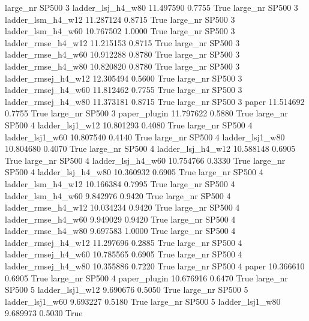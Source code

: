   large_nr    SP500                 3   ladder_lsj_h4_w80  11.497590      0.7755    True
  large_nr    SP500                 3   ladder_lsm_h4_w12  11.287124      0.8715    True
  large_nr    SP500                 3   ladder_lsm_h4_w60  10.767502      1.0000    True
  large_nr    SP500                 3  ladder_rmse_h4_w12  11.215153      0.8715    True
  large_nr    SP500                 3  ladder_rmse_h4_w60  10.912288      0.8780    True
  large_nr    SP500                 3  ladder_rmse_h4_w80  10.820820      0.8780    True
  large_nr    SP500                 3 ladder_rmsej_h4_w12  12.305494      0.5600    True
  large_nr    SP500                 3 ladder_rmsej_h4_w60  11.812462      0.7755    True
  large_nr    SP500                 3 ladder_rmsej_h4_w80  11.373181      0.8715    True
  large_nr    SP500                 3               paper  11.514692      0.7755    True
  large_nr    SP500                 3        paper_plugin  11.797622      0.5880    True
  large_nr    SP500                 4     ladder_lsj1_w12  10.801293      0.4080    True
  large_nr    SP500                 4     ladder_lsj1_w60  10.807540      0.4140    True
  large_nr    SP500                 4     ladder_lsj1_w80  10.804680      0.4070    True
  large_nr    SP500                 4   ladder_lsj_h4_w12  10.588148      0.6905    True
  large_nr    SP500                 4   ladder_lsj_h4_w60  10.754766      0.3330    True
  large_nr    SP500                 4   ladder_lsj_h4_w80  10.360932      0.6905    True
  large_nr    SP500                 4   ladder_lsm_h4_w12  10.166384      0.7995    True
  large_nr    SP500                 4   ladder_lsm_h4_w60   9.842976      0.9420    True
  large_nr    SP500                 4  ladder_rmse_h4_w12  10.034234      0.9420    True
  large_nr    SP500                 4  ladder_rmse_h4_w60   9.949029      0.9420    True
  large_nr    SP500                 4  ladder_rmse_h4_w80   9.697583      1.0000    True
  large_nr    SP500                 4 ladder_rmsej_h4_w12  11.297696      0.2885    True
  large_nr    SP500                 4 ladder_rmsej_h4_w60  10.785565      0.6905    True
  large_nr    SP500                 4 ladder_rmsej_h4_w80  10.355886      0.7220    True
  large_nr    SP500                 4               paper  10.366610      0.6905    True
  large_nr    SP500                 4        paper_plugin  10.676916      0.6470    True
  large_nr    SP500                 5     ladder_lsj1_w12   9.690676      0.5050    True
  large_nr    SP500                 5     ladder_lsj1_w60   9.693227      0.5180    True
  large_nr    SP500                 5     ladder_lsj1_w80   9.689973      0.5030    True
